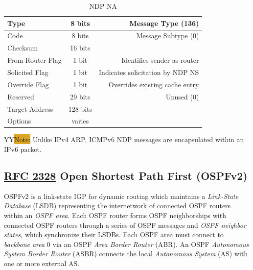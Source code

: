 \documentclass[12pt]{article}
\newcommand{\printColor}{Y}								%
\newcommand{\note}[1]{\if\printColor Y{\colorbox{#1}{Note:}}\else{\underline{Note:}}\fi}
\newcommand{\RFC}[1]{\href{https://datatracker.ietf.org/doc/html/rfc#1}{RFC #1}}
\begin{document}
	\begin{table}[H]
	\centering
	\caption{NDP NA \label{tab:NDP NA}}
	\begin{tabular}{| l | c | r |}\hline
	Type				& 8 bits	& Message Type (136)\\\hline
	Code				& 8 bits	& Message Subtype (0)\\\hline
	Checksum			& 16 bits	&\\\hline
	From Router Flag		& 1 bit 	& Identifies sender as router\\\hline
	Solicited Flag		& 1 bit 	& Indicates solicitation by NDP NS\\\hline
	Override Flag		& 1 bit 	& Overrides existing cache entry\\\hline
	Reserved			& 29 bits	& Unused (0)\\\hline
	Target Address		& 128 bits	&\\\hline
	Options			& varies	&\\\hline
	\end{tabular}\end{table}
	\note{Goldenrod} Unlike IPv4 ARP, ICMPv6 NDP messages are encapsulated within an IPv6 packet.


	\subsection[RFC 2328 OSPFv2]{\RFC{2328} Open Shortest Path First (OSPFv2) \label{subsec:OSPF}}
	OSPFv2 is a link-state IGP for dynamic routing which maintains a \textit{Link-State Database} (LSDB) representing the internetwork of connected OSPF routers within an \textit{OSPF area}. Each OSPF router forms OSPF neighborships with connected OSPF routers through a series of OSPF messages and \textit{OSPF neighbor states}, which synchronize their LSDBs. Each OSPF area must connect to \textit{backbone area} 0 via an OSPF \textit{Area Border Router} (ABR). An OSPF \textit{Autonomous System Border Router} (ASBR) connects the local \textit{Autonomous System} (AS) with one or more external AS.
\end{document}

